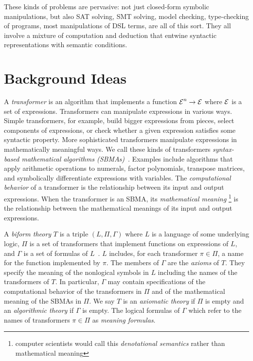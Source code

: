 \documentclass[fleqn]{llncs}
\begin{document}
These kinds of problems are pervasive: not just closed-form symbolic
manipulations, but also SAT solving, SMT solving, model checking,
type-checking of programs, most manipulations of DSL terms, are all
of this sort.  They all involve a mixture of computation and deduction
that entwine syntactic representations with semantic conditions.

\section{Background Ideas}

A \emph{transformer} is an algorithm that implements a function $\mbox{$\cal E$}^n
\rightarrow \mbox{$\cal E$}$ where $\mbox{$\cal E$}$ is a set of expressions.  Transformers can
manipulate expressions in various ways.  Simple transformers, for
example, build bigger expressions from pieces, select components of
expressions, or check whether a given expression satisfies some
syntactic property.  More sophisticated transformers manipulate
expressions in mathematically meaningful ways.  We call these kinds of
transformers \emph{syntax-based mathematical algorithms
  (SBMAs)}~\cite{Farmer13}.  Examples include algorithms that apply
arithmetic operations to numerals, factor polynomials, transpose
matrices, and symbolically differentiate expressions with variables.
The \emph{computational behavior} of a transformer is the relationship
between its input and output expressions.  When the transformer is an
SBMA, its \emph{mathematical meaning}%
\footnote{computer scientists would call this \emph{denotational semantics}
rather than mathematical meaning} is the relationship between the
mathematical meanings of its input and output expressions.

A \emph{biform theory} $T$ is a triple $(L,\Pi,\Gamma)$ where $L$ is a
language of some underlying logic, $\Pi$ is a set of transformers that
implement functions on expressions of $L$, and $\Gamma$ is a set of
formulas of
$L$~\cite{CaretteFarmer08,Farmer07b,FarmerMohrenschildt03}.  $L$
includes, for each transformer $\pi \in \Pi$, a name for the function
implemented by $\pi$.  The members of $\Gamma$ are the \emph{axioms}
of $T$.  They specify the meaning of the nonlogical symbols in $L$
including the names of the transformers of $T$.  In particular,
$\Gamma$ may contain specifications of the computational behavior of
the transformers in $\Pi$ and of the mathematical meaning of the SBMAs
in $\Pi$.  We say $T$ is an \emph{axiomatic theory} if $\Pi$ is empty
and an \emph{algorithmic theory} if $\Gamma$ is empty.  The
logical formulas of $\Gamma$ which refer to the names of transformers $\pi \in
\Pi$ as \emph{meaning formulas}.
\end{document}
